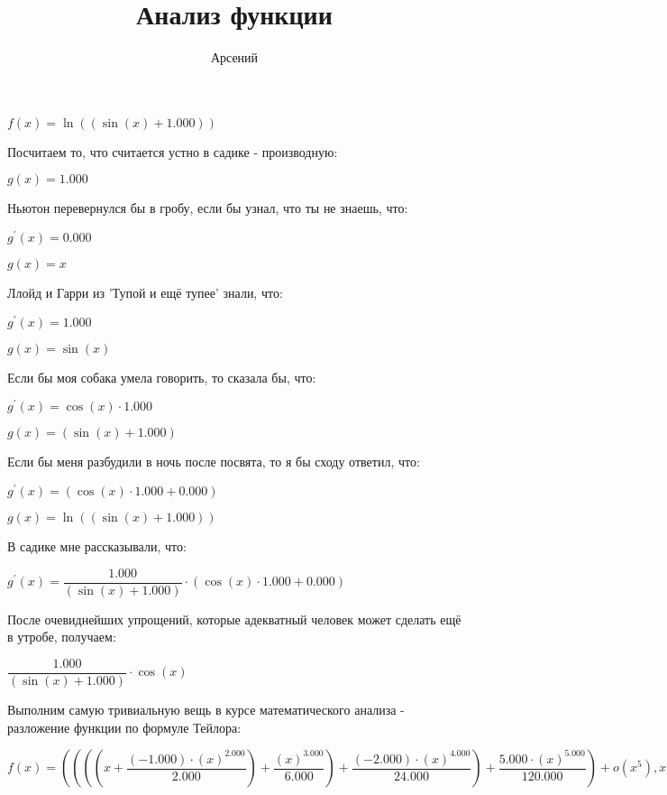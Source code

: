 \documentclass[a4paper,12pt]{article}
\author{\LARGEМерзляков Арсений}
\title{Анализ функции}
\begin{document}
\maketitle
\begin{flushleft}
\Large
$f(x) = \ln {((\sin {(x)}+1.000))}$

Посчитаем то, что считается устно в садике - производную:

$g(x) = 1.000$

Ньютон перевернулся бы в гробу, если бы узнал, что ты не знаешь, что:

$g^{'}(x) = 0.000$

$g(x) = x$

Ллойд и Гарри из 'Тупой и ещё тупее' знали, что:

$g^{'}(x) = 1.000$

$g(x) = \sin {(x)}$

Если бы моя собака умела говорить, то сказала бы, что:

$g^{'}(x) = \cos {(x)} \cdot 1.000$

$g(x) = (\sin {(x)}+1.000)$

Если бы меня разбудили в ночь после посвята, то я бы сходу ответил, что:

$g^{'}(x) = (\cos {(x)} \cdot 1.000+0.000)$

$g(x) = \ln {((\sin {(x)}+1.000))}$

В садике мне рассказывали, что:

$g^{'}(x) =  \dfrac{1.000}{(\sin {(x)}+1.000)}  \cdot (\cos {(x)} \cdot 1.000+0.000)$

После очевиднейших упрощений, которые адекватный человек может сделать ещё в утробе, получаем:

$ \dfrac{1.000}{(\sin {(x)}+1.000)}  \cdot \cos {(x)}$

Выполним самую тривиальную вещь в курсе математического анализа - разложение функции по формуле Тейлора: 

$f(x) = ((((x+ \dfrac{(-1.000) \cdot (x)^{2.000}}{2.000} )+ \dfrac{(x)^{3.000}}{6.000} )+ \dfrac{(-2.000) \cdot (x)^{4.000}}{24.000} )+ \dfrac{5.000 \cdot (x)^{5.000}}{120.000} ) + o(x^{5}), x \rightarrow 0$

\end{flushleft}
\end{document}
